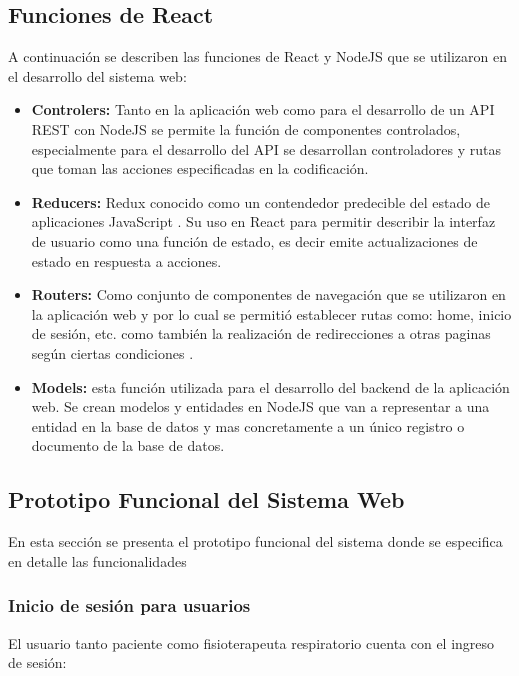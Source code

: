 \documentclass[12pt]{article}
\begin{document}
\subsection{Funciones de React}

A continuación se describen las funciones de React y NodeJS que se utilizaron en el desarrollo del sistema web:

\begin{itemize}
    \item \textbf{Controlers:} Tanto en la aplicación web como para el desarrollo de un API REST con NodeJS se permite la función de componentes controlados, especialmente para el desarrollo del API se desarrollan controladores y rutas que toman las acciones especificadas en la codificación.
    \item \textbf{Reducers:} Redux conocido como un contendedor predecible del estado de aplicaciones JavaScript \cite{34}. Su uso en React para permitir describir la interfaz de usuario como una función de estado, es decir emite actualizaciones de estado en respuesta a acciones. 
    \item \textbf{Routers:} Como conjunto de componentes de navegación que se utilizaron en la aplicación web y por lo cual se permitió establecer rutas como: home, inicio de sesión, etc. como también la realización de redirecciones a otras paginas según ciertas condiciones \cite{35}.
    \item \textbf{Models:} esta función utilizada para el desarrollo del backend de la aplicación web. Se crean modelos y entidades en NodeJS que van a representar a una entidad en la base de datos y mas concretamente a un único registro o documento de la base de datos.
    
    
\end{itemize}

\newpage


\subsection{Prototipo Funcional del Sistema Web }

En esta sección se presenta el prototipo funcional del sistema donde se especifica en detalle las funcionalidades

\subsubsection{Inicio de sesión para usuarios}

El usuario tanto paciente como fisioterapeuta respiratorio cuenta con el ingreso de sesión:
\end{document}
